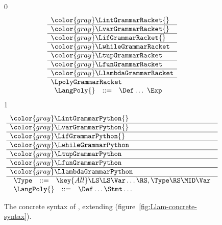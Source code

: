 \documentclass[7x10]{TimesAPriori_MIT}%
\newcommand{\gray}[1]{{\color{gray} #1}}
\def\racketEd{0}
\def\pythonEd{1}
\def\edition{1}
\newcommand{\pythonColor}[0]{}
\numberwithin{theorem}{chapter}
\numberwithin{definition}{chapter}
\numberwithin{equation}{chapter}
\begin{document}
\newcommand{\LpolyGrammarPython}{
\begin{array}{lcl}
  \Type &::=& \key{All}\LS \LS\Var\ldots\RS,\Type\RS \MID \Var 
\end{array}
}

\newcommand{\LpolyASTPython}{
\begin{array}{lcl}
  \Type &::=& \key{AllType}\LP\LS\Var\ldots\RS, \Type\RP
    \MID \key{GenericVar}\LP\Var\RP
\end{array}
}  


\begin{figure}[tp]
\centering
\begin{tcolorbox}[colback=white]
\footnotesize
{\if\edition\racketEd
\[
\begin{array}{l}
  \gray{\LintGrammarRacket{}} \\ \hline
  \gray{\LvarGrammarRacket{}} \\ \hline
  \gray{\LifGrammarRacket{}} \\ \hline
  \gray{\LwhileGrammarRacket} \\ \hline
  \gray{\LtupGrammarRacket} \\   \hline
  \gray{\LfunGrammarRacket} \\   \hline
  \gray{\LlambdaGrammarRacket} \\ \hline
  \LpolyGrammarRacket \\
\begin{array}{lcl}
  \LangPoly{} &::=& \Def \ldots ~ \Exp
\end{array}
\end{array}
\]
\fi}
{\if\edition\pythonEd\pythonColor
\[
\begin{array}{l}
  \gray{\LintGrammarPython{}} \\ \hline
  \gray{\LvarGrammarPython{}} \\ \hline
  \gray{\LifGrammarPython{}} \\ \hline
  \gray{\LwhileGrammarPython} \\ \hline
  \gray{\LtupGrammarPython} \\   \hline
  \gray{\LfunGrammarPython} \\   \hline
  \gray{\LlambdaGrammarPython} \\\hline
  \LpolyGrammarPython \\
  \begin{array}{lcl}
    \LangPoly{} &::=& \Def\ldots \Stmt\ldots
  \end{array}
\end{array}
\]
\fi}
\end{tcolorbox}

\caption{The concrete syntax of \LangPoly{}, extending \LangLam{}
    (figure~\ref{fig:Llam-concrete-syntax}).}
\label{fig:Lpoly-concrete-syntax}
\end{figure}
\end{document}
